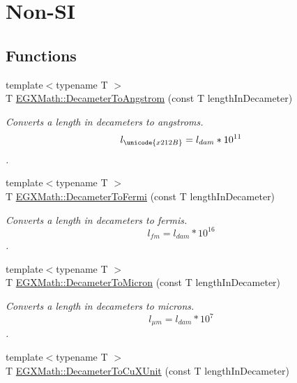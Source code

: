 \hypertarget{group___e_g_x_math-_conversions-_length_conversions-_decameter-_non-_s_i}{}\section{Non-\/\+SI}
\label{group___e_g_x_math-_conversions-_length_conversions-_decameter-_non-_s_i}
\subsection*{Functions}
\begin{DoxyCompactItemize}
\item 
{\footnotesize template$<$typename T $>$ }\\T \mbox{\hyperlink{group___e_g_x_math-_conversions-_length_conversions-_decameter-_non-_s_i_ga2ea722ea1c773432c2680fe6ebd67638}{E\+G\+X\+Math\+::\+Decameter\+To\+Angstrom}} (const T length\+In\+Decameter)
\begin{DoxyCompactList}\small\item\em Converts a length in decameters to angstroms. \[ l_{\unicode{x212B}}=l_{dam} * 10^{11} \]. \end{DoxyCompactList}\item 
{\footnotesize template$<$typename T $>$ }\\T \mbox{\hyperlink{group___e_g_x_math-_conversions-_length_conversions-_decameter-_non-_s_i_gadc348f062b782f64f13784377f032f9b}{E\+G\+X\+Math\+::\+Decameter\+To\+Fermi}} (const T length\+In\+Decameter)
\begin{DoxyCompactList}\small\item\em Converts a length in decameters to fermis. \[ l_{fm}=l_{dam} * 10^{16} \]. \end{DoxyCompactList}\item 
{\footnotesize template$<$typename T $>$ }\\T \mbox{\hyperlink{group___e_g_x_math-_conversions-_length_conversions-_decameter-_non-_s_i_gaf3c7befd051b823dc17aca5318cae689}{E\+G\+X\+Math\+::\+Decameter\+To\+Micron}} (const T length\+In\+Decameter)
\begin{DoxyCompactList}\small\item\em Converts a length in decameters to microns. \[ l_{\mu m}=l_{dam} * 10^{7} \]. \end{DoxyCompactList}\item 
{\footnotesize template$<$typename T $>$ }\\T \mbox{\hyperlink{group___e_g_x_math-_conversions-_length_conversions-_decameter-_non-_s_i_gaf256500ca4f0b7a62018ea61078c29e3}{E\+G\+X\+Math\+::\+Decameter\+To\+Cu\+X\+Unit}} (const T length\+In\+Decameter)

\end{DoxyCompactItemize}
